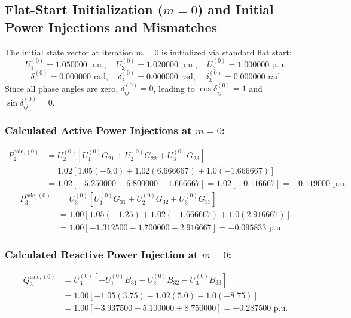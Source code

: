 \documentclass[12pt,a4paper,oneside]{report}
\begin{document}
\subsection{Flat-Start Initialization ($m = 0$) and Initial Power Injections and Mismatches}
The initial state vector at iteration $m = 0$ is initialized via standard flat start:
\begin{equation}
U_1^{(0)} = 1.050000\text{ p.u.}, \quad U_2^{(0)} = 1.020000\text{ p.u.}, \quad U_3^{(0)} = 1.000000\text{ p.u.}
\end{equation}
\begin{equation}
\delta_1^{(0)} = 0.000000\text{ rad}, \quad \delta_2^{(0)} = 0.000000\text{ rad}, \quad \delta_3^{(0)} = 0.000000\text{ rad}
\end{equation}
Since all phase angles are zero, $\delta_{ij}^{(0)} = 0$, leading to $\cos\delta_{ij}^{(0)} = 1$ and $\sin\delta_{ij}^{(0)} = 0$.

\subsubsection{Calculated Active Power Injections at $m = 0$:}
\begin{align}
P_2^{\text{calc},(0)} &= U_2^{(0)} \left[ U_1^{(0)} G_{21} + U_2^{(0)} G_{22} + U_3^{(0)} G_{23} \right] \nonumber \\
&= 1.02 \left[ 1.05(-5.0) + 1.02(6.666667) + 1.0(-1.666667) \right] \nonumber \\
&= 1.02 \left[ -5.250000 + 6.800000 - 1.666667 \right] = 1.02 \left[ -0.116667 \right] = -0.119000\text{ p.u.}
\end{align}
\begin{align}
P_3^{\text{calc},(0)} &= U_3^{(0)} \left[ U_1^{(0)} G_{31} + U_2^{(0)} G_{32} + U_3^{(0)} G_{33} \right] \nonumber \\
&= 1.00 \left[ 1.05(-1.25) + 1.02(-1.666667) + 1.0(2.916667) \right] \nonumber \\
&= 1.00 \left[ -1.312500 - 1.700000 + 2.916667 \right] = -0.095833\text{ p.u.}
\end{align}

\subsubsection{Calculated Reactive Power Injection at $m = 0$:}
\begin{align}
Q_3^{\text{calc},(0)} &= U_3^{(0)} \left[ -U_1^{(0)} B_{31} - U_2^{(0)} B_{32} - U_3^{(0)} B_{33} \right] \nonumber \\
&= 1.00 \left[ -1.05(3.75) - 1.02(5.0) - 1.0(-8.75) \right] \nonumber \\
&= 1.00 \left[ -3.937500 - 5.100000 + 8.750000 \right] = -0.287500\text{ p.u.}
\end{align}
\end{document}
